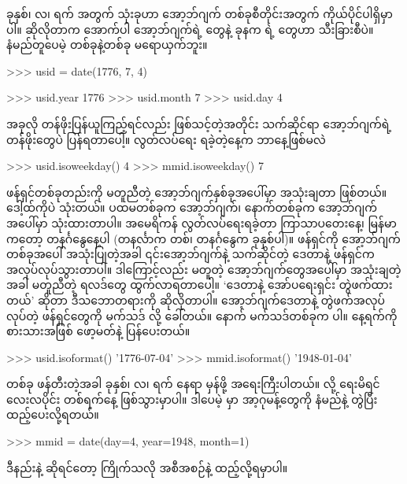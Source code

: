 ခုနှစ်၊ လ၊ ရက် အတွက်  သုံးခုဟာ  အော့ဘ်ဂျက် တစ်ခုစီတိုင်းအတွက် ကိုယ်ပိုင်ပါရှိမှာပါ။ ဆိုလိုတာက အောက်ပါ  အော့ဘ်ဂျက်ရဲ့  တွေနဲ့ ခုနက  ရဲ့  တွေဟာ သီးခြားစီပဲ။ နံမည်တူပေမဲ့ တစ်ခုနဲ့တစ်ခု မရောယှက်ဘူး။
\begin{codetxt}
>>> usid = date(1776, 7, 4)
\end{codetxt}
\betweenminted{\medskipamount}
\begin{codetxt}
>>> usid.year
1776
>>> usid.month
7
>>> usid.day
4
\end{codetxt}
အခုလို တန်ဖိုးပြန်ယူကြည့်ရင်လည်း ဖြစ်သင့်တဲ့အတိုင်း သက်ဆိုင်ရာ အော့ဘ်ဂျက်ရဲ့  တန်ဖိုးတွေပဲ ပြန်ရတာပေါ့။ လွတ်လပ်ရေး ရခဲ့တဲ့နေ့က ဘာနေ့ဖြစ်မလဲ 
\begin{codetxt}
>>> usid.isoweekday()
4
>>> mmid.isoweekday()
7
\end{codetxt}
ဖန်ရှင်တစ်ခုတည်းကို မတူညီတဲ့ အော့ဘ်ဂျက်နှစ်ခုအပေါ်မှာ အသုံးချတာ ဖြစ်တယ်။ ဒေါ့ထ်ကိုပဲ သုံးတယ်။ ပထမတစ်ခုက  အော့ဘ်ဂျက်၊ နောက်တစ်ခုက  အော့ဘ်ဂျက်အပေါ်မှာ သုံးထားတာပါ။ အမေရိကန်  လွတ်လပ်ရေးရခဲ့တာ ကြာသာပတေးနေ့၊ မြန်မာကတော့ တနင်္ဂနွေနေ့ပါ (တနင်္လာက တစ်၊ တနင်္ဂနွေက ခုနှစ်ပါ)။  ဖန်ရှင်ကို အော့ဘ်ဂျက်တစ်ခုအပေါ် အသုံးပြုတဲ့အခါ ၎င်းအော့ဘ်ဂျက်နဲ့ သက်ဆိုင်တဲ့ ဒေတာနဲ့ ဖန်ရှင်က အလုပ်လုပ်သွားတာပါ။ ဒါကြောင့်လည်း  မတူတဲ့ အော့ဘ်ဂျက်တွေအပေါ်မှာ အသုံးချတဲ့အခါ မတူညီတဲ့ ရလဒ်တွေ ထွက်လာရတာပေါ့။ ‘ဒေတာနဲ့ အော်ပရေးရှင်း တွဲဖက်ထားတယ်’ ဆိုတာ ဒီသဘောတရားကို ဆိုလိုတာပါ။ အော့ဘ်ဂျက်ဒေတာနဲ့ တွဲဖက်အလုပ်လုပ်တဲ့ ဖန်ရှင်တွေကို မက်သဒ်  လို့ ခေါ်တယ်။ နောက် မက်သဒ်တစ်ခုက  ပါ။ နေ့ရက်ကို စားသားအဖြစ်  ဖော့မတ်နဲ့ ပြန်ပေးတယ်။
\begin{codetxt}
>>> usid.isoformat()
'1776-07-04'
>>> mmid.isoformat()
'1948-01-04'
\end{codetxt}

 တစ်ခု ဖန်တီးတဲ့အခါ ခုနှစ်၊ လ၊ ရက် နေရာ မှန်ဖို့ အရေးကြီးပါတယ်။  လို့ ရေးမိရင် လေးလပိုင်း တစ်ရက်နေ့ ဖြစ်သွားမှာပါ။ ဒါပေမဲ့  မှာ အာ့ဂုမန့်တွေကို နံမည်နဲ့ တွဲပြီး ထည့်ပေးလို့ရတယ်။ 
\begin{codetxt}
>>> mmid = date(day=4, year=1948, month=1)
\end{codetxt}
ဒီနည်းနဲ့ ဆိုရင်တော့ \fEn{,} \fEn{,}  ကြိုက်သလို အစီအစဉ်နဲ့ ထည့်လို့ရမှာပါ။ 

